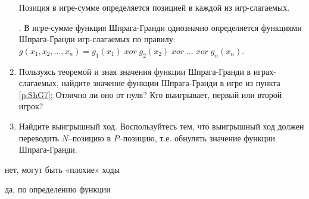 \begin{problem}
\begin{enumerate}
Позиция в игре-сумме определяется позицией в каждой из игр-слагаемых.\par
{}.
В игре-сумме функция Шпрага-Гранди однозначно определяется функциями Шпрага-Гранди игр-слагаемых по правилу:  $g\left(x_{1},x_{2},\ldots,x_{n} \right)=g_{1} \left(x_{1} \right)\; xor\; g_{2} \left(x_{2} \right)\; xor\; \ldots \; xor\; g_{n} \left(x_{n} \right)$.
\item	Пользуясь теоремой и зная значения функции Шпрага-Гранди в играх-слагаемых, найдите значение функции Шпрага-Гранди в игре из пункта \ref{p:ShG7}; Отлично ли оно от нуля? Кто выигрывает, первый или второй игрок?\par
\item	Найдите выигрышный ход. Воспользуйтесь тем, что выигрышный ход должен переводить  $N$--позицию в  $P$--позицию, т.е. обнулять значение функции Шпрага-Гранди.
\end{enumerate}


\begin{sol}
\item нет, могут быть «плохие» ходы \par
\item да, по определению функции
\end{sol}
\end{problem}



